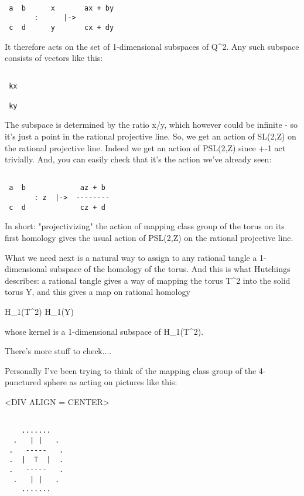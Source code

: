 \begin{verbatim}

 a  b      x       ax + by
       :      |->     
 c  d      y       cx + dy
\end{verbatim}
    
It therefore acts on the set of 1-dimensional subspaces of Q^{2}.
Any such subspace consists of vectors like this:

\begin{verbatim}

 kx 

 ky 
\end{verbatim}
    
The subspace is determined by the ratio x/y, which however could be 
infinite - so it's just a point in the rational projective line.  So,
we get an action of SL(2,Z) on the rational projective line.  Indeed
we get an action of PSL(2,Z) since +-1 act trivially.  And, you can 
easily check that it's the action we've already seen:


\begin{verbatim}

 a  b             az + b
       : z  |->  --------
 c  d             cz + d
\end{verbatim}
    
In short: "projectivizing" the action of mapping class group of the 
torus on its first homology gives the usual action of PSL(2,Z) on the 
rational projective line.  

What we need next is a natural way to assign to any rational tangle 
a 1-dimensional subspace of the homology of the torus.  And this is 
what Hutchings describes: a rational tangle gives a way of mapping 
the torus T^{2} into the solid torus Y, and this gives a 
map on rational homology

H_{1}(T^{2}) \to  H_{1}(Y)

whose kernel is a 1-dimensional subspace of H_{1}(T^{2}).   

There's more stuff to check....
 
Personally I've been trying to think of the mapping class group 
of the 4-punctured sphere as acting on pictures like this: 

<DIV ALIGN = CENTER>

\begin{verbatim}

    .......   
  .   | |   . 
 .   -----   .
 .  |  T  |  .
 .   -----   .
  .   | |   . 
    .......   
\end{verbatim}
    
